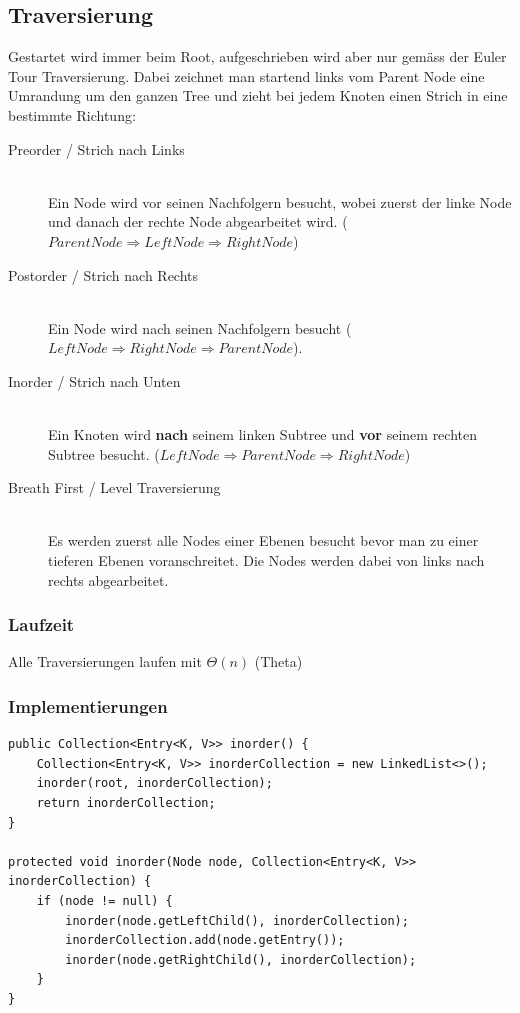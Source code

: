\subsection{Traversierung}
Gestartet wird immer beim Root, aufgeschrieben wird aber nur gemäss der Euler Tour Traversierung. Dabei zeichnet man startend links vom Parent Node eine Umrandung um den ganzen Tree und zieht bei jedem Knoten einen Strich in eine bestimmte Richtung:
\begin{description}
	\item[Preorder / Strich nach Links] \hfill \\
	Ein Node wird vor seinen Nachfolgern besucht, wobei zuerst der linke Node und danach der rechte Node abgearbeitet wird. ($Parent Node \Rightarrow Left Node \Rightarrow Right Node$)
	\item[Postorder / Strich nach Rechts] \hfill \\
	Ein Node wird nach seinen Nachfolgern besucht ($Left Node \Rightarrow Right Node \Rightarrow Parent Node$).
	\item[Inorder / Strich nach Unten] \hfill \\
	Ein Knoten wird \textbf{nach} seinem linken Subtree und \textbf{vor} seinem rechten Subtree besucht.
	($Left Node \Rightarrow Parent Node \Rightarrow Right Node$)
	\item[Breath First / Level Traversierung] \hfill \\
	Es werden zuerst alle Nodes einer Ebenen besucht bevor man zu einer tieferen Ebenen voranschreitet. Die Nodes werden dabei von links nach rechts abgearbeitet.
\end{description}

\subsubsection{Laufzeit}
Alle Traversierungen laufen mit $\Theta(n)$ (Theta)

\subsubsection{Implementierungen}
\begin{lstlisting}[caption=Inorder Traversal]
public Collection<Entry<K, V>> inorder() {
	Collection<Entry<K, V>> inorderCollection = new LinkedList<>();
	inorder(root, inorderCollection);
	return inorderCollection;
}

protected void inorder(Node node, Collection<Entry<K, V>> inorderCollection) {
	if (node != null) {
		inorder(node.getLeftChild(), inorderCollection);
		inorderCollection.add(node.getEntry());
		inorder(node.getRightChild(), inorderCollection);
	}
}

\end{lstlisting}


